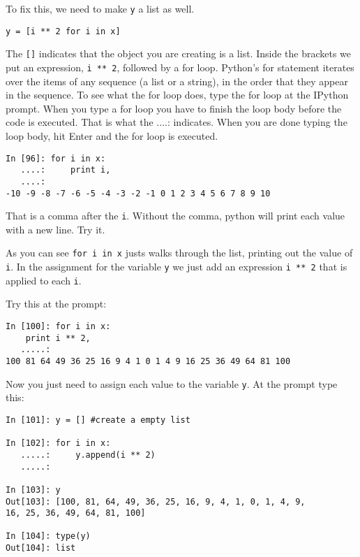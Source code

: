 \documentclass[12pt]{article}
\begin{document}
To fix this, we need to make \texttt{y} a list as well. 

\begin{lstlisting}[style=bash]
y = [i ** 2 for i in x]
\end{lstlisting}

The \texttt{[]} indicates that the object you are creating is a list. Inside the brackets we put an expression, \texttt{i ** 2}, followed by a for loop. Python's for statement iterates over the items of any sequence (a list or a string), in the order that they appear in the sequence. To see what the for loop does, type the for loop at the IPython prompt. When you type a for loop you have to finish the loop body before the code is executed. That is what the ....: indicates. When you are done typing the loop body, hit Enter and the for loop is executed.

\begin{lstlisting}[style=bash]
In [96]: for i in x: 
   ....:     print i,
   ....:     
-10 -9 -8 -7 -6 -5 -4 -3 -2 -1 0 1 2 3 4 5 6 7 8 9 10
\end{lstlisting}

That is a comma after the \texttt{i}. Without the comma, python will print each value with a new line. Try it. 

As you can see \texttt{for i in x} justs walks through the list, printing out the value of \texttt{i}. In the assignment for the variable \texttt{y} we just add an expression \texttt{i ** 2} that is applied to each \texttt{i}.

Try this at the prompt:

\begin{lstlisting}[style=bash]
In [100]: for i in x:
    print i ** 2,
   .....:     
100 81 64 49 36 25 16 9 4 1 0 1 4 9 16 25 36 49 64 81 100
\end{lstlisting}

Now you just need to assign each value to the variable \texttt{y}. At the prompt type this:

\begin{lstlisting}[style=bash]
In [101]: y = [] #create a empty list

In [102]: for i in x:
   .....:     y.append(i ** 2)
   .....:     

In [103]: y
Out[103]: [100, 81, 64, 49, 36, 25, 16, 9, 4, 1, 0, 1, 4, 9, 
16, 25, 36, 49, 64, 81, 100]

In [104]: type(y)
Out[104]: list
\end{lstlisting}
\end{document}

